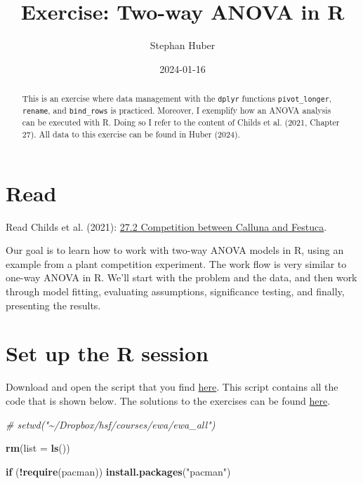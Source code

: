\documentclass[
]{article}
\title{Exercise: Two-way ANOVA in R}
\author{Stephan Huber}
\date{2024-01-16}
\newenvironment{Shaded}{\begin{snugshade}}{\end{snugshade}}
\newcommand{\AttributeTok}[1]{\textcolor[rgb]{0.13,0.29,0.53}{#1}}
\newcommand{\CommentTok}[1]{\textcolor[rgb]{0.56,0.35,0.01}{\textit{#1}}}
\newcommand{\ControlFlowTok}[1]{\textcolor[rgb]{0.13,0.29,0.53}{\textbf{#1}}}
\newcommand{\FunctionTok}[1]{\textcolor[rgb]{0.13,0.29,0.53}{\textbf{#1}}}
\newcommand{\NormalTok}[1]{#1}
\newcommand{\SpecialCharTok}[1]{\textcolor[rgb]{0.81,0.36,0.00}{\textbf{#1}}}
\newcommand{\StringTok}[1]{\textcolor[rgb]{0.31,0.60,0.02}{#1}}
\begin{document}
\maketitle
\begin{abstract}
This is an exercise where data management with the \texttt{dplyr}
functions \texttt{pivot\_longer}, \texttt{rename}, and
\texttt{bind\_rows} is practiced. Moreover, I exemplify how an ANOVA
analysis can be executed with R. Doing so I refer to the content of
Childs et al. (2021, Chapter 27). All data to this exercise can be found
in Huber (2024).
\end{abstract}

\hypertarget{read}{%
\section{Read}\label{read}}

Read Childs et al. (2021):
\href{https://dzchilds.github.io/stats-for-bio/two-way-anova-in-r.html}{27.2
Competition between Calluna and Festuca}.

Our goal is to learn how to work with two-way ANOVA models in R, using
an example from a plant competition experiment. The work flow is very
similar to one-way ANOVA in R. We'll start with the problem and the
data, and then work through model fitting, evaluating assumptions,
significance testing, and finally, presenting the results.

\hypertarget{set-up-the-r-session}{%
\section{Set up the R session}\label{set-up-the-r-session}}

Download and open the script that you find
\href{https://raw.githubusercontent.com/hubchev/ewa/main/rmd_festuca/r_festuca.R}{here}.
This script contains all the code that is shown below. The solutions to
the exercises can be found
\href{https://raw.githubusercontent.com/hubchev/ewa/main/rmd_festuca/r_festuca_solutions.R}{here}.

\begin{Shaded}
\begin{Highlighting}[]
\CommentTok{\# setwd("\textasciitilde{}/Dropbox/hsf/courses/ewa/ewa\_all")}

\FunctionTok{rm}\NormalTok{(}\AttributeTok{list =} \FunctionTok{ls}\NormalTok{())}

\ControlFlowTok{if}\NormalTok{ (}\SpecialCharTok{!}\FunctionTok{require}\NormalTok{(pacman)) }\FunctionTok{install.packages}\NormalTok{(}\StringTok{"pacman"}\NormalTok{)}
\end{Highlighting}
\end{Shaded}
\end{document}
